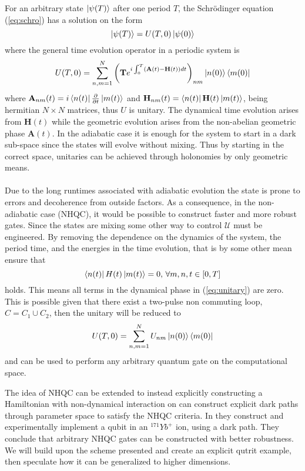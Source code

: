 For an arbitrary state $\ket{\psi(T)}$ after one period $T$, the Schrödinger equation (\ref{eq:schro}) has a solution on the form 
\begin{equation}
\label{eq:gen_sol}
\ket{\psi(T)} = U(T,0)\ket{\psi(0)}
\end{equation}
where the general time evolution operator in a periodic system is 
\begin{equation}
\label{eq:unitary}
U(T,0) = \sum_{n,m = 1}^N\left(\mathbf{T}e^{i\int_0^T \left(\mathbf{A}(t) - \mathbf{H}(t)\right) dt}\right)_{nm}\ket{n(0)}\bra{m(0)}
\end{equation}
where $\mathbf{A}_{nm}(t) = i\bra{n(t)}\pdv{}{t}\ket{m(t)}$ and
$\mathbf{H}_{nm}(t) = \bra{n(t)}\mathbf{H}(t)\ket{m(t)}$, being hermitian $N\times N$ matrices, thus $U$ is unitary.
The dynamical time evolution arises from $\mathbf{H}(t)$ while the geometric evolution arises from the non-abelian geometric phase $\mathbf{A}(t)$. In the adiabatic case it is enough for the system to start in a dark sub-space since the states will evolve without mixing. Thus by starting in the correct space, unitaries can be achieved through holonomies by only geometric means\cite{adiabatensatz,AHQC}.
\\
\\
Due to the long runtimes associated with adiabatic evolution the state is prone to errors and decoherence from outside factors\cite{NHQC}. As a consequence, in the non-adiabatic case (NHQC), it would be possible to construct faster and more robust gates. Since the states are mixing some other way to control $\mathcal{U}$ must be engineered. By removing the dependence on the dynamics of the system, the period time, and the energies in the time evolution, that is by some other mean ensure that 
\begin{equation}
\bra{n(t)}H(t)\ket{m(t)} = 0,\,\forall m,n, t\in[0,T]
\end{equation} 
holds. This means all terms in the dynamical phase in (\ref{eq:unitary}) are zero.
This is possible given that there exist a two-pulse non commuting loop, $C = C_1 \cup C_2$\cite{NHQC,sLoop}, 
then the unitary will be reduced to 
\begin{equation}
U(T,0) = \sum_{n,m = 1}^{N} U_{nm}\ket{n(0)}\bra{m(0)}
\end{equation}
and can be used to perform any arbitrary quantum gate on the computational space.

The idea of NHQC can be extended to instead explicitly constructing a Hamiltonian with non-dynamical interaction on can construct explicit dark paths through parameter space to satisfy the NHQC criteria. In \cite{darkpath} they construct and experimentally implement a qubit in an $^{171}Yb^{+}$ ion, using a dark path. They conclude that arbitrary NHQC gates can be constructed with better robustness. We will build upon the scheme presented and create an explicit qutrit example, then speculate how it can be generalized to higher dimensions.

